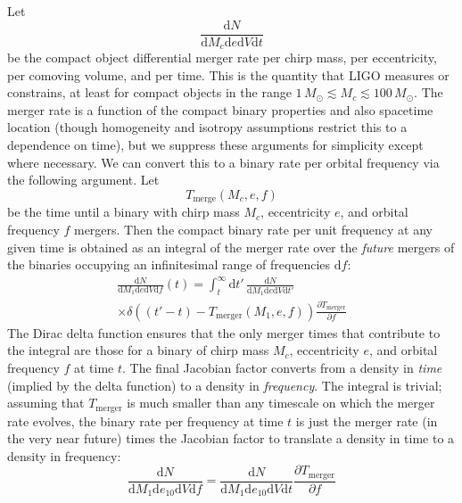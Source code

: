 \documentclass[twocolumn]{aastex631}
\newcommand{\dd}{\mathrm{d}}
\newcommand{\diff}[2]{\frac{\dd #1}{\dd #2}}
\newcommand{\MSun}{M_\odot}
\begin{document}
Let 
\begin{equation}
    \diff{N}{M_c \dd e \dd V \dd t} 
\end{equation}
be the compact object differential merger rate per chirp mass, per eccentricity,
per comoving volume, and per time.  This is the quantity that LIGO measures or
constrains, at least for compact objects in the range $1 \, \MSun \lesssim M_c
\lesssim 100 \, \MSun$.  The merger rate is a function of the compact binary
properties and also spacetime location (though homogeneity and isotropy
assumptions restrict this to a dependence on time), but we suppress these
arguments for simplicity except where necessary.  We can convert this to a
binary rate per orbital frequency via the following argument.  Let 
\begin{equation}
    T_\mathrm{merge}\left( M_c, e, f \right)
\end{equation}
be the time until a binary with chirp mass $M_c$, eccentricity $e$,
and orbital frequency $f$ mergers.  Then the compact binary rate per unit frequency at any given time is
obtained as an integral of the merger rate over the \emph{future} mergers of the
binaries occupying an infinitesimal range of frequencies $\dd f$:
\begin{multline}
    \diff{N}{M_1 \dd e \dd V \dd f}\left( t \right) = \int_{t}^{\infty} \dd t' \, \diff{N}{M_1 \dd e \dd V \dd t'} \\ \times \delta\left( \left( t' - t \right) - T_\mathrm{merger}\left( M_1, e, f \right) \right) \frac{\partial T_\mathrm{merger}}{\partial f}
\end{multline}
The Dirac delta function ensures that the only merger times that contribute to
the integral are those for a binary of chirp mass $M_c$, eccentricity $e$, and
orbital frequency $f$ at time $t$.  The final Jacobian factor converts from a
density in \emph{time} (implied by the delta function) to a density in
\emph{frequency}.  The integral is trivial; assuming that $T_\mathrm{merger}$ is
much smaller than any timescale on which the merger rate evolves, the binary
rate per frequency at time $t$ is just the merger rate (in the very near future)
times the Jacobian factor to translate a density in time to a density in
frequency:
\begin{equation}
    \label{eq:mergers-per-frequency}
    \diff{N}{M_1 \dd e_{10} \dd V \dd f} = \diff{N}{M_1 \dd e_{10} \dd V \dd t} \frac{\partial T_\mathrm{merger}}{\partial f}
\end{equation}
\end{document}
